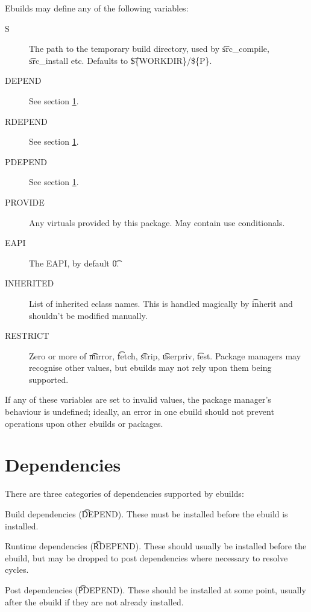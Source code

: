 Ebuilds may define any of the following variables:

\begin{description}
\item[S] The path to the temporary build directory, used by \t{src\_compile}, \t{src\_install}
    etc. Defaults to \t{\$\{WORKDIR\}/\$\{P\}}.
\item[DEPEND] See section \ref{dependencies}.
\item[RDEPEND] See section \ref{dependencies}.
\item[PDEPEND] See section \ref{dependencies}.
\item[PROVIDE] Any  virtuals provided by this package. May contain use conditionals.
    \label{ebuild-var-provide}
\item[EAPI] The EAPI, by default \t{0}.
\item[INHERITED] List of inherited eclass names. This is handled magically by \t{inherit} and
    shouldn't be modified manually.
\item[RESTRICT] Zero or more of \t{mirror}, \t{fetch}, \t{strip}, \t{userpriv}, \t{test}.
    Package managers may recognise other values, but ebuilds may not rely upon them being
    supported.
\end{description}

If any of these variables are set to invalid values, the package manager's behaviour is undefined;
ideally, an error in one ebuild should not prevent operations upon other ebuilds or packages.

\section{Dependencies}
\label{dependencies}

There are three categories of dependencies supported by ebuilds:

\begin{bulletlist}
\item Build dependencies (\t{DEPEND}). These must be installed before the ebuild is installed.
\item Runtime dependencies (\t{RDEPEND}). These should usually be installed before the ebuild,
    but may be dropped to post dependencies where necessary to resolve cycles.
\item Post dependencies (\t{PDEPEND}). These should be installed at some point, usually after
    the ebuild if they are not already installed.
\end{bulletlist}

